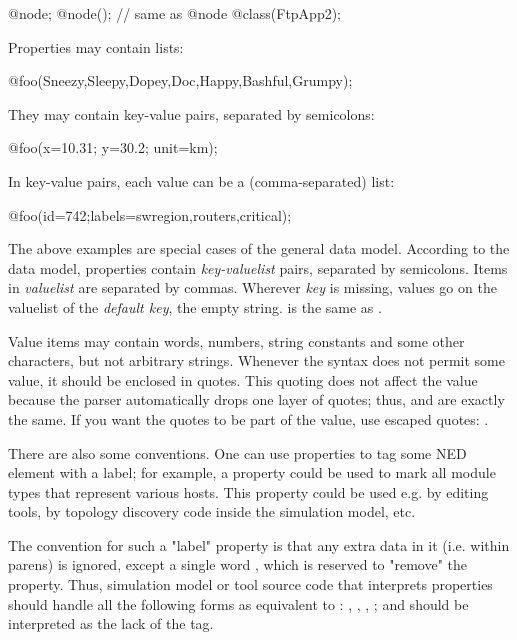 \begin{ned}
@node;
@node(); // same as @node
@class(FtpApp2);
\end{ned}

Properties may contain lists:

\begin{ned}
@foo(Sneezy,Sleepy,Dopey,Doc,Happy,Bashful,Grumpy);
\end{ned}

They may contain key-value pairs, separated by semicolons:

\begin{ned}
@foo(x=10.31; y=30.2; unit=km);
\end{ned}

In key-value pairs, each value can be a (comma-separated) list:

\begin{ned}
@foo(id=742;labels=swregion,routers,critical);
\end{ned}

The above examples are special cases of the general data model. According
to the data model, properties contain \textit{key-valuelist} pairs,
separated by semicolons. Items in \textit{valuelist} are separated by
commas. Wherever \textit{key} is missing, values go on the valuelist of the
\textit{default key}, the empty string.  is the same
as .

Value items may contain words, numbers, string constants and some other
characters, but not arbitrary strings.
Whenever the syntax does not permit some value, it should be enclosed in
quotes. This quoting does not affect the value because
the parser automatically drops one layer of quotes; thus, 
and  are exactly the same. If you want the quotes
to be part of the value, use escaped quotes:
.

There are also some conventions. One can use properties to tag some NED element
with a label; for example, a  property could be used to mark
all module types that represent various hosts. This property could be used
e.g. by editing tools, by topology discovery code inside the simulation model, etc.

The convention for such a "label" property is that any extra data in it
(i.e. within parens) is ignored, except a single word , which is
reserved to "remove" the property. Thus, simulation model or tool source
code that interprets properties should handle all the following forms as
equivalent to : , ,
, ; and
 should be interpreted as the lack of the 
tag.


